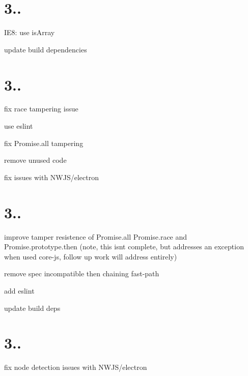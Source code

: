 \section*{3..}


\begin{DoxyItemize}
\item I\+E8\+: use is\+Array
\item update build dependencies
\end{DoxyItemize}

\section*{3..}


\begin{DoxyItemize}
\item fix race tampering issue
\item use eslint
\item fix Promise.\+all tampering
\item remove unused code
\item fix issues with N\+W\+J\+S/electron
\end{DoxyItemize}

\section*{3..}


\begin{DoxyItemize}
\item improve tamper resistence of Promise.\+all Promise.\+race and Promise.\+prototype.\+then (note, this isn\textquotesingle{}t complete, but addresses an exception when used  core-\/js, follow up work will address entirely)
\item remove spec incompatible then chaining fast-\/path
\item add eslint
\item update build deps
\end{DoxyItemize}

\section*{3..}


\begin{DoxyItemize}
\item fix node detection issues with N\+W\+J\+S/electron
\end{DoxyItemize}

